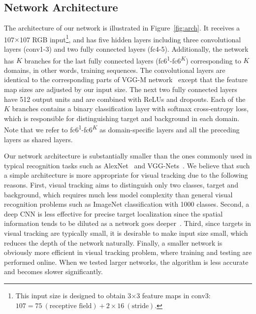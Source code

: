 \documentclass[10pt,twocolumn,letterpaper]{article}
\begin{document}
\subsection{Network Architecture}
The architecture of our network is illustrated in Figure~\ref{fig:arch}.
It receives a 107$\times$107 RGB input\footnote{This input size is designed to obtain 3$\times$3 feature maps in conv3: $107= 75~(\text{receptive field}) + 2\times16~(\text{stride})$.}, and has five hidden layers including three convolutional layers (conv1-3) and two fully connected layers (fc4-5).
Additionally, the network has $K$ branches for the last fully connected layers (fc6\textsuperscript{1}-fc6\textsuperscript{$K$}) corresponding to $K$ domains, in other words, training sequences.
The convolutional layers are identical to the corresponding parts of VGG-M network~\cite{chatfield2014return} except that the feature map sizes are adjusted by our input size.
The next two fully connected layers have 512 output units and are combined with ReLUs and dropouts.
Each of the $K$ branches contains a binary classification layer with softmax cross-entropy loss, which is responsible for distinguishing target and background in each domain.
Note that we refer to fc6\textsuperscript{1}-fc6\textsuperscript{$K$} as domain-specific layers and all the preceding layers as shared layers.

Our network architecture is substantially smaller than the ones commonly used in typical recognition tasks such as AlexNet~\cite{krizhevsky2012imagenet} and VGG-Nets~\cite{chatfield2014return,SimonyanICLR15}.
We believe that such a simple architecture is more appropriate for visual tracking due to the following reasons. 
First, visual tracking aims to distinguish only two classes, target and background, which requires much less model complexity than general visual recognition problems such as ImageNet classification with 1000 classes.
Second, a deep CNN is less effective for precise target localization since the spatial information tends to be diluted as a network goes deeper~\cite{hong2015online}.
Third, since targets in visual tracking are typically small, it is desirable to make input size small, which reduces the depth of the network naturally.
Finally, a smaller network is obviously more efficient in visual tracking problem, where training and testing are performed online.
When we tested larger networks, the algorithm is less accurate and becomes slower significantly.
\end{document}

